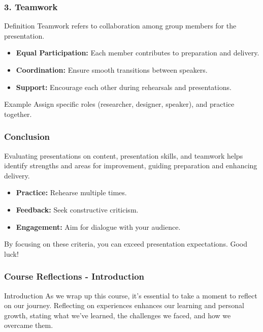 \documentclass[aspectratio=169]{beamer}
\begin{document}
\begin{frame}[fragile]
    \frametitle{3. Teamwork}
    \begin{block}{Definition}
        Teamwork refers to collaboration among group members for the presentation.
    \end{block}
    \begin{itemize}
        \item \textbf{Equal Participation:} Each member contributes to preparation and delivery.
        \item \textbf{Coordination:} Ensure smooth transitions between speakers.
        \item \textbf{Support:} Encourage each other during rehearsals and presentations.
    \end{itemize}
    \begin{block}{Example}
        Assign specific roles (researcher, designer, speaker), and practice together.
    \end{block}
\end{frame}

\begin{frame}[fragile]
    \frametitle{Conclusion}
    Evaluating presentations on content, presentation skills, and teamwork helps identify strengths and areas for improvement, guiding preparation and enhancing delivery.
    \begin{itemize}
        \item \textbf{Practice:} Rehearse multiple times.
        \item \textbf{Feedback:} Seek constructive criticism.
        \item \textbf{Engagement:} Aim for dialogue with your audience.
    \end{itemize}
    By focusing on these criteria, you can exceed presentation expectations. Good luck!
\end{frame}

\begin{frame}[fragile]
    \frametitle{Course Reflections - Introduction}
    \begin{block}{Introduction}
        As we wrap up this course, it's essential to take a moment to reflect on our journey. 
        Reflecting on experiences enhances our learning and personal growth, stating what we’ve learned, 
        the challenges we faced, and how we overcame them.
    \end{block}
\end{frame}
\end{document}
